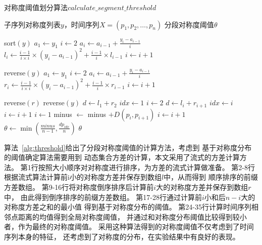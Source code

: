\begin{algorithm}[t]
  \caption{对称度阈值划分算法$calculate\_segment\_threshold$}
  \label{alg:threshold}
  \small
  \begin{algorithmic}
    \REQUIRE 子序列对称度列表$y$，时间序列$X=\left(p_{1}, p_{2}, \dots, p_{n}\right)$
    \ENSURE 分段对称度阈值$\theta$

    \STATE sort$(y)$
    \STATE $a_1 \leftarrow y_1$
    \STATE $i \leftarrow 2$
    \STATE $a_i \leftarrow a_{i-1}+\frac{y_i-a_{i-1}}{i}$
    \STATE $l_i \leftarrow \frac{i-1}{i \times i} \times(y_i-a_{i-1})^{2}+\frac{i-1}{i} \times l_{i-1}$
    \STATE $i \leftarrow i+1$
    \ENDWHILE

    \STATE reverse$(y)$
    \STATE $a_1 \leftarrow y_1$
    \STATE $i \leftarrow 2$
    \STATE $a_i \leftarrow a_{i-1}+\frac{y_i-a_{i-1}}{i}$
    \STATE $r_i \leftarrow \frac{i-1}{i \times i} \times (y_i-a_{i-1})^{2}+\frac{i-1}{i} \times r_{i-1}$
    \STATE $i \leftarrow i+1$
    \ENDWHILE

    \STATE reverse$(r)$
    \STATE reverse$(y)$
    \STATE $d \leftarrow l_1 + r_2$
    \STATE $idx \leftarrow 1$
    \STATE $i \leftarrow 2$
    \STATE $d \leftarrow l_i + r_{i+1}$
    \STATE $idx \leftarrow i$
    \ENDIF
    \STATE $i \leftarrow i+1$
    \ENDWHILE
    \STATE $i \leftarrow 1$
    \STATE minus $\leftarrow$ minus $+D\left(p_{i}, p_{i+1}\right)$
    \STATE $i \leftarrow i+1$
    \ENDWHILE
    \STATE $\theta \leftarrow \min \left(\frac{minus}{n-1}, \frac{dp_{idx}}{n}\right)$
    \RETURN $\theta$
  \end{algorithmic}
\end{algorithm}

算法~\ref{alg:threshold}给出了分段对称度阈值的计算方法，考虑到
基于对称度分布的阈值确定算法需要用到
动态集合方差的计算，本文采用了流式的方差计算方法。
第1行按照大小顺序对对称度进行排序，为方差的流式计算做准备。
第2-8行根据流式算法计算前i小的对称度方差并保存到数组$l$中，从而得到
顺序排序的前缀方差数组。
第9-16行将对称度倒序排序后计算前$i$大的对称度方差并保存到数组$r$中，
由此得到倒序排序的前缀方差数组。
第17-28行通过计算前$i$小和后$n-i$大的对称度方差之和的最小值
得到基于对称度分布的阈值。
第24-35行计算时间序列相邻点距离的均值得到全局对称度阈值，
并通过和对称度分布阈值比较得到较小者，作为最终的对称度阈值。
采用这种算法得到的对称度阈值不仅考虑到了时间序列本身的特征，
还考虑到了对称度的分布，在实验结果中有良好的表现。

